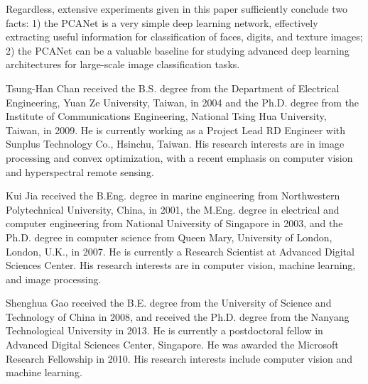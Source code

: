 \documentclass[10pt,journal,compsoc]{IEEEtran}
\begin{document}
Regardless, extensive experiments given in this paper sufficiently conclude two facts: 1) the PCANet is a very simple deep learning network, effectively extracting useful information for classification of faces, digits, and texture images; 2) the PCANet can be a valuable baseline for studying advanced deep learning architectures for large-scale image classification tasks.





\begin{IEEEbiography}
{Tsung-Han Chan} received the B.S. degree from the Department of Electrical Engineering, Yuan Ze University, Taiwan, in 2004
and the Ph.D. degree from the Institute of Communications Engineering, National Tsing Hua University, Taiwan, in 2009. He is currently working as a Project Lead RD Engineer with Sunplus Technology Co., Hsinchu, Taiwan. His research interests are in image processing and convex optimization, with a recent emphasis on computer vision and hyperspectral remote sensing.
\end{IEEEbiography}


\begin{IEEEbiography}
{Kui Jia} received the B.Eng. degree in marine engineering from Northwestern Polytechnical University, China, in 2001, the M.Eng. degree in electrical and computer engineering from National University of Singapore in 2003, and the Ph.D. degree in computer science from Queen Mary, University of London, London, U.K., in 2007. He is currently a Research Scientist at Advanced Digital Sciences Center. His research interests are in computer vision, machine learning, and image processing.
\end{IEEEbiography}



\begin{IEEEbiography}
{Shenghua Gao} received the B.E. degree from the University of Science and Technology of China in 2008, and received the Ph.D. degree from the Nanyang Technological University in 2013. He is currently a postdoctoral fellow in Advanced Digital Sciences Center, Singapore. He was awarded the Microsoft Research Fellowship in 2010. His research interests include computer vision and machine learning.
\end{IEEEbiography}
\end{document}
